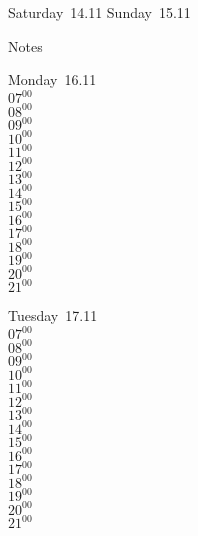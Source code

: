 \documentclass[11pt,a4paper]{book}\usepackage[]{graphicx}\usepackage[]{color}
\begin{document}
\begin{weekendbox}
  Saturday~14.11
  \tcblower
  Sunday~15.11
\end{weekendbox} %
\begin{notebox}
  Notes
\end{notebox}
\clearpage
\begin{headerbox}
\end{headerbox}
\begin{weekdaybox}
  Monday~16.11\\
  { 
  \vfill
  $07^{00}$\\
$08^{00}$\\
$09^{00}$\\
$10^{00}$\\
$11^{00}$\\
$12^{00}$\\
$13^{00}$\\
$14^{00}$\\
$15^{00}$\\
$16^{00}$\\
$17^{00}$\\
$18^{00}$\\
$19^{00}$\\
$20^{00}$\\
$21^{00}$\\
  }
\end{weekdaybox}
\begin{weekdaybox}
  Tuesday~17.11\\
  { 
  \vfill
  $07^{00}$\\
$08^{00}$\\
$09^{00}$\\
$10^{00}$\\
$11^{00}$\\
$12^{00}$\\
$13^{00}$\\
$14^{00}$\\
$15^{00}$\\
$16^{00}$\\
$17^{00}$\\
$18^{00}$\\
$19^{00}$\\
$20^{00}$\\
$21^{00}$\\
  }
\end{weekdaybox}
\end{document}
